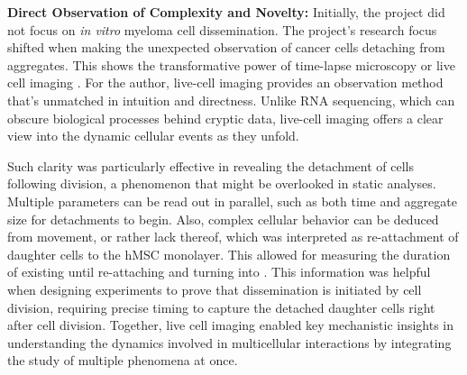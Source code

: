 \textbf{Direct Observation of Complexity and Novelty:}
Initially, the project did not focus on \textit{in vitro} myeloma cell
dissemination. The project's research focus shifted when making the unexpected
 observation of cancer cells
detaching from aggregates. This shows the transformative power of time-lapse
microscopy or live cell imaging \cite{coleLivecellImaging2014}. For the author,
live-cell imaging provides an observation method that's unmatched in intuition
and directness. Unlike RNA sequencing, which can obscure biological processes
behind cryptic data, live-cell imaging offers a clear view into the dynamic
cellular events as they unfold.

Such clarity was particularly effective in revealing the detachment of cells
following division, a phenomenon that might be overlooked in static analyses.
Multiple parameters can be read out in parallel, such as both time and aggregate
size for detachments to begin. Also, complex cellular behavior can be deduced
from movement, or rather lack thereof, which was interpreted as re-attachment of
\INA daughter cells to the \ac{hMSC} monolayer. This allowed for measuring the
duration of \nMAina existing until re-attaching and turning into \MAina. This
information was helpful when designing experiments to prove that dissemination
is initiated by cell division, requiring precise timing to capture the detached
daughter cells right after cell division. Together, live cell imaging enabled
key mechanistic insights in understanding the dynamics involved in multicellular
interactions by integrating the study of multiple phenomena at once.


